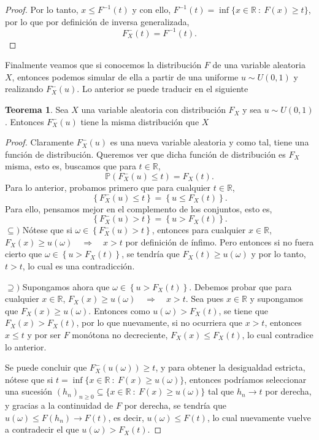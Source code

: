 \documentclass[letterpaper]{article}
\newcommand{\R}{\mathbb{R}}
\renewcommand{\to}{\rightarrow}
\newcommand{\ent}{\Longrightarrow}
\renewcommand{\P}{\mathbb{P}}
\newcommand{\1}{\mathds{1}}
\theoremstyle{definition}
\theoremstyle{definition}
\newtheorem{teo}{Teorema}
\theoremstyle{definition}
\theoremstyle{definition}
\theoremstyle{definition}
\begin{document}
\begin{enumerate}
\begin{proof}
        Por lo tanto, $x\leq F^{-1}(t)$ y con ello, $F^{-1}(t)=\inf\{x\in \R \ : \ F(x)\geq t\}$, por lo que por definición de
        inversa generalizada,
        \[
        F^{-}_X(t)=F^{-1}(t).    
        \]
       \end{proof}
       Finalmente veamos que si conocemos la distribución $F$ de una variable aleatoria $X$, entonces
       podemos simular de ella a partir de una uniforme $u\sim U(0,1)$ y realizando $F_X^{-}(u)$. Lo anterior
       se puede traducir en el siguiente 
       \begin{teo}
        Sea $X$ una variable aleatoria con distribución $F_X$ y sea $u\sim U(0,1)$. Entonces 
        $F^{-}_X(u)$ tiene la misma distribución que $X$
       \end{teo}
       \begin{proof} 
         Claramente $F^{-}_X(u)$ es una nueva variable aleatoria y como tal, tiene una función 
         de distribución. Queremos ver que dicha función de distribución es $F_X$ misma, esto es,
         buscamos que para $t\in \R$,
         \[
         \P\left(F^{-}_X(u)\leq t\right)=F_X(t). 
         \] 
         Para lo anterior, probamos primero que para cualquier $t\in \R$, 
         \[
         \left\{F_X^{-}(u)\leq t\right\}=\left\{u\leq F_X(t)\right\}.
         \]
         Para ello, pensamos mejor en el complemento de los conjuntos, esto es, 
         \[
          \left\{F_X^{-}(u)> t\right\}=\left\{u> F_X(t)\right\}.
         \]
         $\subseteq)$ Nótese que si $\omega \in \left\{F^{-}_X(u)> t\right\}$, entonces 
         para cualquier $x\in \R$, $F_X(x)\geq u(\omega) \quad \ent \quad x>t$ por definición de ínfimo. Pero entonces si no fuera
         cierto que $\omega \in  \left\{u> F_X(t)\right\}$, se tendría que $F_X(t)\geq u(\omega)$ y por lo 
         tanto, $t>t$, lo cual es una contradicción.
         \newline

         $\supseteq)$ Supongamos ahora que $\omega \in \left\{u> F_X(t)\right\}$. Debemos
         probar que para cualquier $x\in \R$, $F_X(x)\geq u(\omega) \quad \ent \quad x>t$.
         Sea pues $x\in \R$ y supongamos que $F_X(x)\geq u(\omega)$. Entonces como $u(\omega)>F_X(t)$,
         se tiene que $F_X(x)>F_X(t)$, por lo que nuevamente, si no ocurriera que $x>t$, entonces
         $x\leq t$ y por ser $F$ monótona no decreciente, $F_X(x)\leq F_X(t)$, lo cual
         contradice lo anterior.
         
         Se puede concluir que $F^{-}_X(u(\omega))\geq t$, y para obtener la desigualdad estricta, 
         nótese que si $t=\inf\{x\in \R \ : \ F(x)\geq u(\omega)\}$, entonces podríamos seleccionar una
         sucesión $(h_n)_{n\geq0}\subseteq \{x\in \R \ : \ F(x)\geq u(\omega)\}$ tal que $h_n\to t$ por derecha, 
         y gracias a la continuidad de $F$ por derecha, se tendría que $u(\omega)\leq F(h_n)\to F(t)$, es decir, $u(\omega)\leq F(t)$, 
         lo cual nuevamente vuelve a contradecir el que $u(\omega)>F_X(t)$. 
         \newline


\end{proof}
\end{enumerate}
\end{document}

